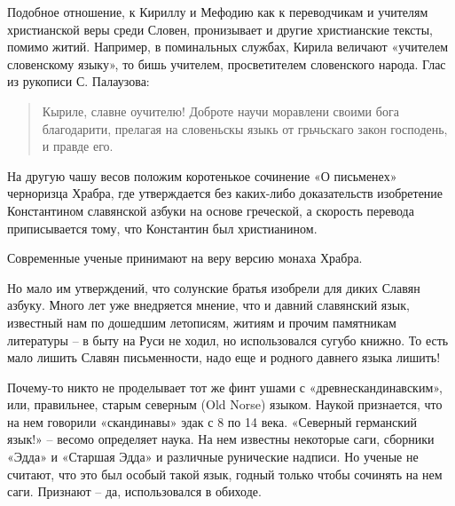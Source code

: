 Подобное отношение, к Кириллу и Мефодию как к переводчикам и учителям христианской веры среди Словен, пронизывает и другие христианские тексты, помимо житий. Например, в поминальных службах, Кирила величают «учителем словенскому языку», то бишь учителем, просветителем словенского народа. Глас из рукописи С. Палаузова:

\begin{quotation}
Кыриле, славне оучителю! Доброте научи моравлени своими бога благодарити, прелагая на словеньскы языкь от грьчьскаго закон господень, и правде его.
\end{quotation}

На другую чашу весов положим коротенькое сочинение «О письменех» черноризца Храбра, где утверждается без каких-либо доказательств изобретение Константином славянской азбуки на основе греческой, а скорость перевода приписывается тому, что Константин был христианином.

Современные ученые принимают на веру версию монаха Храбра.

Но мало им утверждений, что солунские братья изобрели для диких Славян азбуку. Много лет уже внедряется мнение, что и давний славянский язык, известный нам по дошедшим летописям, житиям и прочим памятникам литературы – в быту на Руси не ходил, но использовался сугубо книжно. То есть мало лишить Славян письменности, надо еще и родного давнего языка лишить!



Почему-то никто не проделывает тот же финт ушами с «древнескандинавским», или, правильнее, старым северным (Old Norse) языком. Наукой признается, что на нем говорили «скандинавы» эдак с 8 по 14 века. «Северный германский язык!» – весомо определяет наука. На нем известны некоторые саги, сборники «Эдда» и «Старшая Эдда» и различные рунические надписи. Но ученые не считают, что это был особый такой язык, годный только чтобы сочинять на нем саги. Признают – да, использовался в обиходе.

